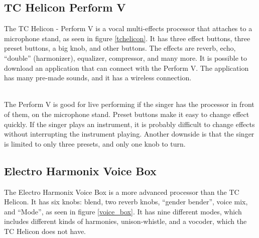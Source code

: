 \subsection{TC Helicon Perform V}

The TC Helicon - Perform V is a vocal multi-effects processor that attaches to a microphone stand, as seen in figure \ref{tchelicon}\citep{TC}. It has three effect buttons, three preset buttons, a big knob, and other buttons. The effects are reverb, echo, “double” (harmonizer), equalizer, compressor, and many more. It is possible to download an application that can connect with the Perform V. The application has many pre-made sounds, and it has a wireless connection. \\

\begin{minipage}{\linewidth}%
\label{tchelicon}
\end{minipage}\\

The Perform V is good for live performing if the singer has the processor in front of them, on the microphone stand. Preset buttons make it easy to change effect quickly. 
If the singer plays an instrument, it is probably difficult to change effects without interrupting the instrument playing. Another downside is that the singer is limited to only three presets, and only one knob to turn.

\subsection{Electro Harmonix Voice Box}

The Electro Harmonix Voice Box is a more advanced processor than the TC Helicon\citep{VoiceBox}. It has six knobs: blend, two reverb knobs, “gender bender”, voice mix, and “Mode”, as seen in figure \ref{voice_box}. It has nine different modes, which includes different kinds of harmonies, unison-whistle, and a vocoder, which the TC Helicon does not have.\\

\begin{minipage}{\linewidth}%
\label{voice_box}
\end{minipage}\\

